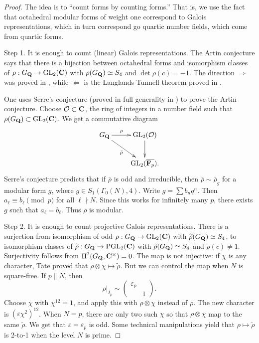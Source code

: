 \begin{proof}
The idea is to ``count forms by counting forms.'' That is, we use the fact 
that octahedral modular forms of weight one correspond to Galois 
representations, which in turn correspond go quartic number fields, which 
come from quartic forms. 

Step 1. It is enough to count (linear) Galois representations. The Artin 
conjecture says that there is a bijection between octahedral forms and 
isomorphism classes of $\rho:G_{\mathbf{Q}} \to \operatorname{GL}_2(\mathbf{C})$ with 
$\rho(G_{\mathbf{Q}})\simeq S_4$ and $\det\rho(c)=-1$. The direction $\Rightarrow$ was 
proved in \cite{ds74}, while $\Leftarrow$ is the Langlands-Tunnell theorem 
proved in \cite{l80,t81}.

One uses Serre's conjecture (proved in full generality in 
\cite{kw09-i,kw09-ii}) to prove the Artin conjecture. Choose 
$\mathcal{O}\subset \mathbf{C}$, the ring of integers in a number field such that 
$\rho(G_{\mathbf{Q}})\subset \operatorname{GL}_2(\mathbf{C})$. We get a commutative diagram 
\[\xymatrix{
  G_\dQ \ar[r]^-\rho \ar[dr]_-{\bar\rho} 
    & \generallinear_2(\cO) \ar[d] \\ 
  & \generallinear_2(\overline{\dF_p}) .
}\]
Serre's conjecture predicts that if $\bar\rho$ is odd and irreducible, then 
$\bar\rho\sim \bar\rho_g$ for a modular form $g$, where 
$g\in S_1(\Gamma_0(N),4)$. Write $g=\sum b_n q^n$. Then 
$a_\ell\equiv b_\ell\pmod p$ for all $\ell\nmid N$. Since this works for 
infinitely many $p$, there exists $g$ such that $a_\ell=b_\ell$. Thus 
$\rho$ is modular. 

Step 2. It is enough to count projective Galois representations. There is 
a surjection from isomorphism of odd $\rho:G_{\mathbf{Q}}\to \operatorname{GL}_2(\mathbf{C})$ 
with $\widetilde\rho(G_{\mathbf{Q}})\simeq S_4$, to isomorphism classes of 
$\widetilde\rho:G_{\mathbf{Q}}\to \operatorname{PGL}_2(\mathbf{C})$ with 
$\widetilde\rho(G_{\mathbf{Q}})\simeq S_4$ and $\widetilde\rho(c)\ne 1$. Surjectivity 
follows from $\operatorname{H}^2(G_{\mathbf{Q}},\mathbf{C}^\times)=0$. The map is not injective: if 
$\chi$ is any character, Tate proved that 
$\rho\otimes\chi\mapsto\widetilde\rho$. But we can control the map when $N$ is 
square-free. If $p\| N$, then 
\[
  \rho|_{I_p} \sim \begin{pmatrix} \varepsilon_p \\ & 1 \end{pmatrix} .
\]
Choose $\chi$ with $\chi^{12}=1$, and apply this with $\rho\otimes\chi$ 
instead of $\rho$. The new character is $(\varepsilon\chi^2)^{12}$. When 
$N=p$, there are only two such $\chi$ so that $\rho\otimes\chi$ map to the 
same $\widetilde\rho$. We get that $\varepsilon=\varepsilon_p$ is odd. Some 
technical manipulations yield that $\rho\mapsto \widetilde\rho$ is 
2-to-1 when the level $N$ is prime. 


\end{proof}
